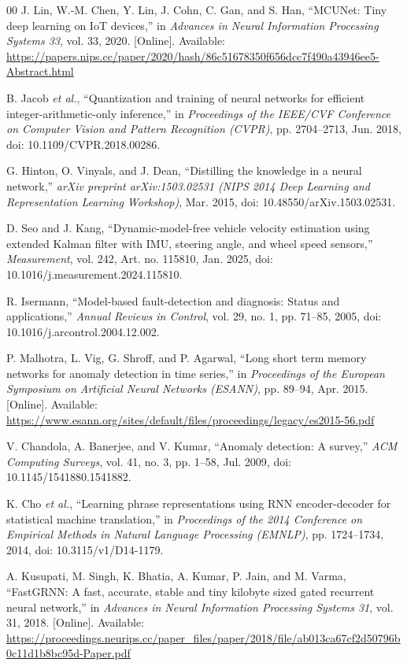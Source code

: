 \documentclass{ieeeaccess}
\begin{document}
\begin{thebibliography}{00}
 J. Lin, W.-M. Chen, Y. Lin, J. Cohn, C. Gan, and S. Han, ``MCUNet: Tiny deep learning on IoT devices,'' in \emph{Advances in Neural Information Processing Systems 33}, vol. 33, 2020. [Online]. Available: \url{https://papers.nips.cc/paper/2020/hash/86c51678350f656dcc7f490a43946ee5-Abstract.html}

 B. Jacob \emph{et al.}, ``Quantization and training of neural networks for efficient integer-arithmetic-only inference,'' in \emph{Proceedings of the IEEE/CVF Conference on Computer Vision and Pattern Recognition (CVPR)}, pp. 2704--2713, Jun. 2018, doi: 10.1109/CVPR.2018.00286.

 G. Hinton, O. Vinyals, and J. Dean, ``Distilling the knowledge in a neural network,'' \emph{arXiv preprint arXiv:1503.02531 (NIPS 2014 Deep Learning and Representation Learning Workshop)}, Mar. 2015, doi: 10.48550/arXiv.1503.02531.

 D. Seo and J. Kang, ``Dynamic-model-free vehicle velocity estimation using extended Kalman filter with IMU, steering angle, and wheel speed sensors,'' \emph{Measurement}, vol. 242, Art. no. 115810, Jan. 2025, doi: 10.1016/j.measurement.2024.115810.

 R. Isermann, ``Model-based fault-detection and diagnosis: Status and applications,'' \emph{Annual Reviews in Control}, vol. 29, no. 1, pp. 71--85, 2005, doi: 10.1016/j.arcontrol.2004.12.002.

 P. Malhotra, L. Vig, G. Shroff, and P. Agarwal, ``Long short term memory networks for anomaly detection in time series,'' in \emph{Proceedings of the European Symposium on Artificial Neural Networks (ESANN)}, pp. 89--94, Apr. 2015. [Online]. Available: \url{https://www.esann.org/sites/default/files/proceedings/legacy/es2015-56.pdf}

 V. Chandola, A. Banerjee, and V. Kumar, ``Anomaly detection: A survey,'' \emph{ACM Computing Surveys}, vol. 41, no. 3, pp. 1--58, Jul. 2009, doi: 10.1145/1541880.1541882.

 K. Cho \emph{et al.}, ``Learning phrase representations using RNN encoder-decoder for statistical machine translation,'' in \emph{Proceedings of the 2014 Conference on Empirical Methods in Natural Language Processing (EMNLP)}, pp. 1724--1734, 2014, doi: 10.3115/v1/D14-1179.

 A. Kusupati, M. Singh, K. Bhatia, A. Kumar, P. Jain, and M. Varma, ``FastGRNN: A fast, accurate, stable and tiny kilobyte sized gated recurrent neural network,'' in \emph{Advances in Neural Information Processing Systems 31}, vol. 31, 2018. [Online]. Available: \url{https://proceedings.neurips.cc/paper_files/paper/2018/file/ab013ca67cf2d50796b0c11d1b8bc95d-Paper.pdf}


\end{thebibliography}
\end{document}
